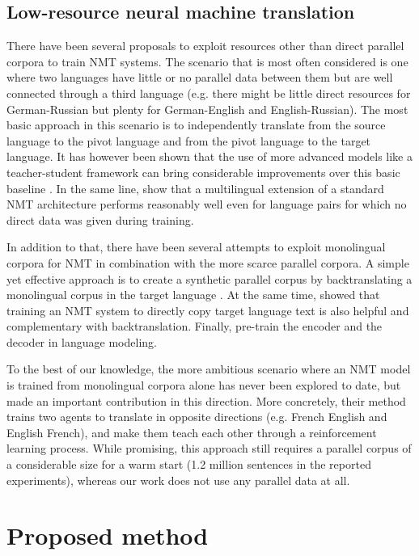 \documentclass{article} \usepackage{iclr2018_conference,times}
\begin{document}
\subsection{Low-resource neural machine translation} 
\label{subsec:nmt}

There have been several proposals to exploit resources other than direct parallel corpora to train NMT systems. The scenario that is most often considered is one where two languages have little or no parallel data between them but are well connected through a third language (e.g. there might be little direct resources for German-Russian but plenty for German-English and English-Russian). The most basic approach in this scenario is to independently translate from the source language to the pivot language and from the pivot language to the target language. It has however been shown that the use of more advanced models like a teacher-student framework can bring considerable improvements over this basic baseline \citep{firat2016zero,che2017teacher}. In the same line, \citet{johnson2017google} show that a multilingual extension of a standard NMT architecture performs reasonably well even for language pairs for which no direct data was given during training.

In addition to that, there have been several attempts to exploit monolingual corpora for NMT in combination with the more scarce parallel corpora. A simple yet effective approach is to create a synthetic parallel corpus by backtranslating a monolingual corpus in the target language \citep{sennrich2016improving}. At the same time, \citet{currey2017copied} showed that training an NMT system to directly copy target language text is also helpful and complementary with backtranslation. Finally, \citet{ramachandran2017unsupervised} pre-train the encoder and the decoder in language modeling.

To the best of our knowledge, the more ambitious scenario where an NMT model is trained from monolingual corpora alone has never been explored to date, but \citet{he2016dual} made an important contribution in this direction. More concretely, their method trains two agents to translate in opposite directions (e.g. French  English and English  French), and make them teach each other through a reinforcement learning process. While promising, this approach still requires a parallel corpus of a considerable size for a warm start (1.2 million sentences in the reported experiments), whereas our work does not use any parallel data at all.


\section{Proposed method} 
\label{sec:method}
\end{document}
